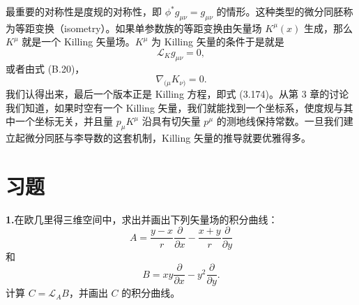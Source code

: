 最重要的对称性是度规的对称性，即 $\phi^* g_{\mu\nu} = g_{\mu\nu}$ 的情形。这种类型的微分同胚称为等距变换（isometry）。如果单参数族的等距变换由矢量场 $K^\mu(x)$ 生成，那么 $K^\mu$ 就是一个 Killing 矢量场。$K^\mu$ 为 Killing 矢量的条件于是就是
\begin{equation*}
\mathcal{L}_K g_{\mu\nu} = 0,
\tag{B.29}
\end{equation*}
或者由式 (B.20)，
\begin{equation*}
\nabla_{(\mu} K_{\nu)} = 0.
\tag{B.30}
\end{equation*}
我们认得出来，最后一个版本正是 Killing 方程，即式 (3.174)。从第 3 章的讨论我们知道，如果时空有一个 Killing 矢量，我们就能找到一个坐标系，使度规与其中一个坐标无关，并且量 $p_\mu K^\mu$ 沿具有切矢量 $p^\mu$ 的测地线保持常数。一旦我们建立起微分同胚与李导数的这套机制，Killing 矢量的推导就要优雅得多。

\section{习题}

\textbf{1.}\quad 在欧几里得三维空间中，求出并画出下列矢量场的积分曲线：
\begin{equation*}
A = \frac{y - x}{r} \frac{\partial}{\partial x} - \frac{x + y}{r} \frac{\partial}{\partial y}
\end{equation*}
和
\begin{equation*}
B = x y \frac{\partial}{\partial x} - y^2 \frac{\partial}{\partial y}.
\end{equation*}
计算 $C = \mathcal{L}_A B$，并画出 $C$ 的积分曲线。

